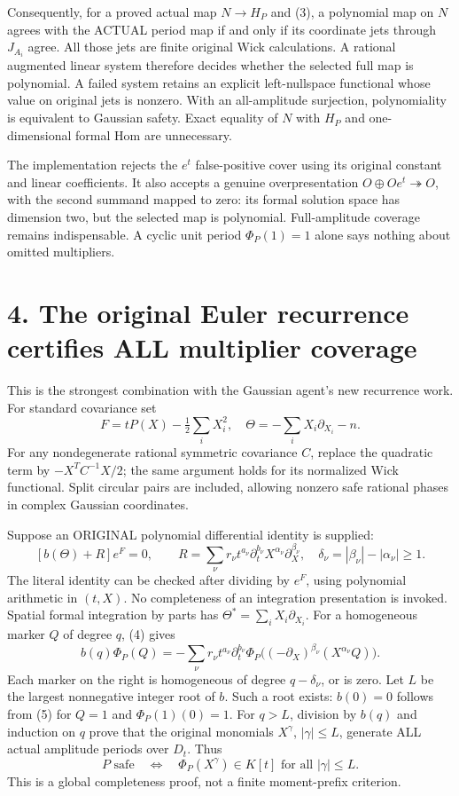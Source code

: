 \documentclass[11pt]{article}
\begin{document}
Consequently, for a proved actual map $N\to H_P$ and (3), a polynomial map on $N$ agrees with the ACTUAL period map if and only if its coordinate jets through $J_{A_i}$ agree. All those jets are finite original Wick calculations. A rational augmented linear system therefore decides whether the selected full map is polynomial. A failed system retains an explicit left-nullspace functional whose value on original jets is nonzero. With an all-amplitude surjection, polynomiality is equivalent to Gaussian safety. Exact equality of $N$ with $H_P$ and one-dimensional formal Hom are unnecessary.

The implementation rejects the $e^t$ false-positive cover using its original constant and linear coefficients. It also accepts a genuine overpresentation $O\oplus Oe^t\twoheadrightarrow O$, with the second summand mapped to zero: its formal solution space has dimension two, but the selected map is polynomial. Full-amplitude coverage remains indispensable. A cyclic unit period $\Phi_P(1)=1$ alone says nothing about omitted multipliers.

\section*{4. The original Euler recurrence certifies ALL multiplier coverage}
This is the strongest combination with the Gaussian agent's new recurrence work. For standard covariance set
\[
 F=tP(X)-\tfrac12\sum_i X_i^2,\quad
 \Theta=-\sum_i X_i\partial_{X_i}-n .
\]
For any nondegenerate rational symmetric covariance $C$, replace the quadratic term by $-X^TC^{-1}X/2$; the same argument holds for its normalized Wick functional. Split circular pairs are included, allowing nonzero safe rational phases in complex Gaussian coordinates.

Suppose an ORIGINAL polynomial differential identity is supplied:
\[
 [b(\Theta)+R]e^F=0,\qquad
 R=\sum_\nu r_\nu t^{a_\nu}\partial_t^{b_\nu}
                         X^{\alpha_\nu}\partial_X^{\beta_\nu},
 \quad\delta_\nu=|\beta_\nu|-|\alpha_\nu|\ge1.              \tag{4}
\]
The literal identity can be checked after dividing by $e^F$, using polynomial arithmetic in $(t,X)$. No completeness of an integration presentation is invoked. Spatial formal integration by parts has $\Theta^*=\sum_i X_i\partial_{X_i}$. For a homogeneous marker $Q$ of degree $q$, (4) gives
\[
 b(q)\Phi_P(Q)=-\sum_\nu r_\nu t^{a_\nu}\partial_t^{b_\nu}
       \Phi_P\big((-\partial_X)^{\beta_\nu}(X^{\alpha_\nu}Q)\big).       \tag{5}
\]
Each marker on the right is homogeneous of degree $q-\delta_\nu$, or is zero. Let $L$ be the largest nonnegative integer root of $b$. Such a root exists: $b(0)=0$ follows from (5) for $Q=1$ and $\Phi_P(1)(0)=1$. For $q>L$, division by $b(q)$ and induction on $q$ prove that the original monomials $X^\gamma$, $|\gamma|\le L$, generate ALL actual amplitude periods over $D_t$. Thus
\[
 P\text{ safe}\quad\Longleftrightarrow\quad
 \Phi_P(X^\gamma)\in K[t]\text{ for all }|\gamma|\le L.        \tag{6}
\]
This is a global completeness proof, not a finite moment-prefix criterion.
\end{document}
